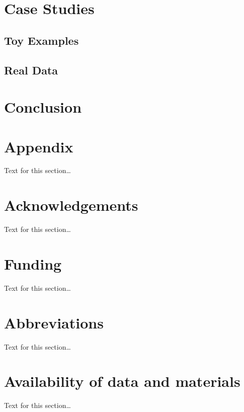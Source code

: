 \documentclass{bmcart}
\begin{document}
{\section{Case Studies}

\subsection{Toy Examples}

\subsection{Real Data}


\section{Conclusion}


\section*{Appendix}
Text for this section\ldots


\begin{backmatter}

\section*{Acknowledgements}%
Text for this section\ldots

\section*{Funding}%
Text for this section\ldots

\section*{Abbreviations}%
Text for this section\ldots

\section*{Availability of data and materials}%
Text for this section\ldots


\end{backmatter}}
\end{document}
